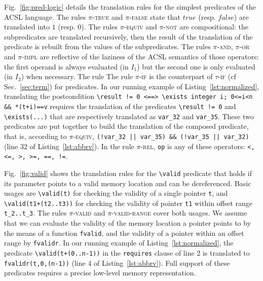 Fig.~\ref{fig:pred-logic} details the translation rules for the simplest
predicates of the \textsc{ACSL} language. The rules \textsc{$\pi$-true} and
\textsc{$\pi$-false} state that $true$ (resp. $false$) are translated into $1$
(resp. $0$). The rules \textsc{$\pi$-equiv} and
\textsc{$\pi$-not} are
compositional: the subpredicates are translated recursively, then the result of
the translation of the predicate is rebuilt from the values of the subpredicates.
The rules \textsc{$\pi$-and},
\textsc{$\pi$-or} and \textsc{$\pi$-impl} are reflective of the laziness of
the \textsc{ACSL} semantics of those operators: the first operand is always
evaluated (in $I_1$) but the second one is only evaluated (in $I_2$) when necessary. The rule
The rule \textsc{$\pi$-if} is the counterpart of \textsc{$\tau$-if} (cf
Sec.~\ref{sec:term}) for predicates.
In our running example of Listing~\ref{lst:normalized}, translating 
the postcondition
\lstinline{\result != 0 <==> \exists integer i; 0<=i<n && *(t+i)==v} requires
the translation of the predicates \lstinline|\result != 0| and
\lstinline{\exists(...)} that are respectively translated as \lstinline|var_32|
and \lstinline|var_35|. These two predicates are put together to build the
translation of
the composed predicate, that is, according to \textsc{$\pi$-equiv},
\lstinline{(!var_32 || var_35) && (!var_35 || var_32)} (line 32 of
Listing~\ref{lst:abbrv}).
In the rule \textsc{$\pi$-rel}, \lstinline|op| is any of these
operators: \lstinline[style=c]{<, <=, >, >=, ==, !=}.

Fig.~\ref{fig:valid} shows the translation rules for the \lstinline|\valid|
predicate that holds if its parameter points to a valid memory location and can
be dereferenced. 
Basic usages are
\lstinline{\valid(t)} 
for checking  the validity of a single 
pointer \lstinline{t},
and \lstinline|\valid(t1+(t2..t3))| for checking the validity of 
pointer \lstinline{t1} within offset range \lstinline|t_2..t_3|. The rules \textsc{$\pi$-valid} and
\textsc{$\pi$-valid-range} cover both usages. We assume that we can
evaluate the validity of the memory location a pointer points to by the means of
a function \lstinline|fvalid|, and the validity of a pointer 
within an offset range by \lstinline|fvalidr|.
In our running example of Listing~\ref{lst:normalized}, the predicate
\lstinline|\valid(t+(0..n-1))| in the \lstinline|requires| clause of line 2 is
translated to \lstinline[style=c]|fvalidr(t,0,(n-1))| (line 4 of
Listing~\ref{lst:abbrv}).
Full support of these predicates requires a precise low-level
memory representation.

